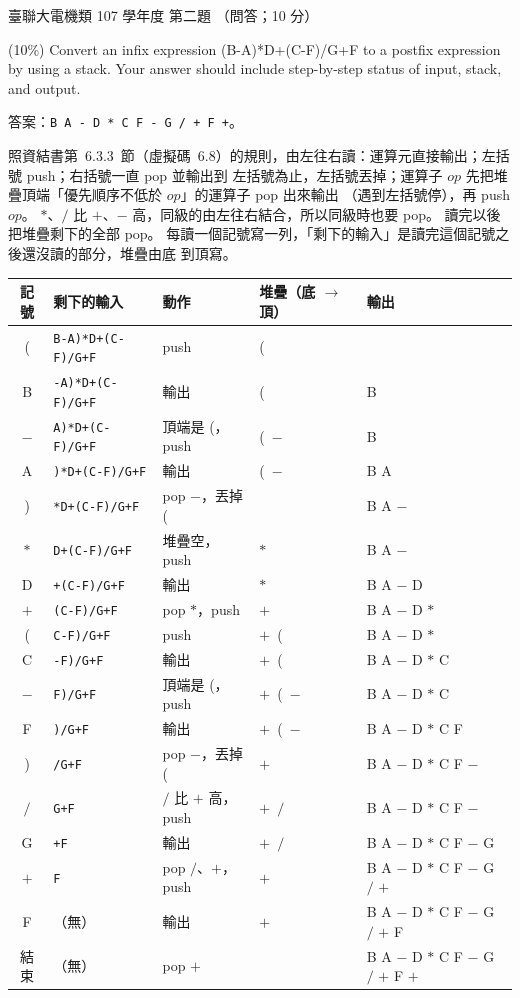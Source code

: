\begin{pastexam}[label={px:ust-107-ee-ds-02}]{臺聯大電機類 107 學年度 第二題}
（問答；10 分）

(10\%) Convert an infix expression (B-A)*D+(C-F)/G+F to a postfix expression by using a stack. Your answer should include step-by-step status of input, stack, and output.
\end{pastexam}

\begin{pastsoln}
答案：\texttt{B A - D * C F - G / + F +}。

照資結書第~6.3.3~節（虛擬碼~6.8）的規則，由左往右讀：運算元直接輸出；左括號 push；右括號一直 pop 並輸出到
左括號為止，左括號丟掉；運算子 $\mathit{op}$ 先把堆疊頂端「優先順序不低於 $\mathit{op}$」的運算子 pop 出來輸出
（遇到左括號停），再 push $\mathit{op}$。 $*$、$/$ 比 $+$、$-$ 高，同級的由左往右結合，所以同級時也要 pop。
讀完以後把堆疊剩下的全部 pop。 每讀一個記號寫一列，「剩下的輸入」是讀完這個記號之後還沒讀的部分，堆疊由底
到頂寫。

\begin{center}
\small
\begin{tabular}{@{}cllll@{}}
\toprule
記號 & 剩下的輸入 & 動作 & 堆疊（底 $\to$ 頂） & 輸出 \\
\midrule
( & \texttt{B-A)*D+(C-F)/G+F} & push & ( &  \\
B & \texttt{-A)*D+(C-F)/G+F} & 輸出 & ( & B \\
$-$ & \texttt{A)*D+(C-F)/G+F} & 頂端是 (，push & (~$-$ & B \\
A & \texttt{)*D+(C-F)/G+F} & 輸出 & (~$-$ & B A \\
) & \texttt{*D+(C-F)/G+F} & pop $-$，丟掉 ( &  & B A $-$ \\
$*$ & \texttt{D+(C-F)/G+F} & 堆疊空，push & $*$ & B A $-$ \\
D & \texttt{+(C-F)/G+F} & 輸出 & $*$ & B A $-$ D \\
$+$ & \texttt{(C-F)/G+F} & pop $*$，push & $+$ & B A $-$ D $*$ \\
( & \texttt{C-F)/G+F} & push & $+$~( & B A $-$ D $*$ \\
C & \texttt{-F)/G+F} & 輸出 & $+$~( & B A $-$ D $*$ C \\
$-$ & \texttt{F)/G+F} & 頂端是 (，push & $+$~(~$-$ & B A $-$ D $*$ C \\
F & \texttt{)/G+F} & 輸出 & $+$~(~$-$ & B A $-$ D $*$ C F \\
) & \texttt{/G+F} & pop $-$，丟掉 ( & $+$ & B A $-$ D $*$ C F $-$ \\
$/$ & \texttt{G+F} & $/$ 比 $+$ 高，push & $+$~$/$ & B A $-$ D $*$ C F $-$ \\
G & \texttt{+F} & 輸出 & $+$~$/$ & B A $-$ D $*$ C F $-$ G \\
$+$ & \texttt{F} & pop $/$、$+$，push & $+$ & B A $-$ D $*$ C F $-$ G $/$ $+$ \\
F & （無） & 輸出 & $+$ & B A $-$ D $*$ C F $-$ G $/$ $+$ F \\
結束 & （無） & pop $+$ &  & B A $-$ D $*$ C F $-$ G $/$ $+$ F $+$ \\
\bottomrule
\end{tabular}
\end{center}


\end{pastsoln}
